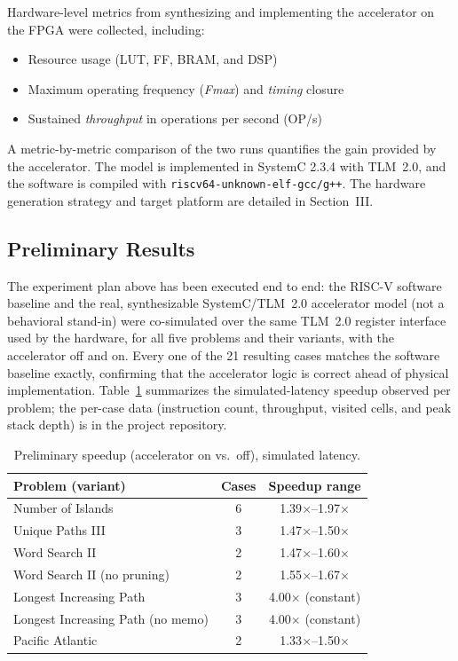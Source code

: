 \documentclass[conference]{IEEEtran}
\begin{document}
Hardware-level metrics from synthesizing and implementing the
accelerator on the FPGA were collected, including:

\begin{itemize}
\item Resource usage (LUT, FF, BRAM, and DSP)
\item Maximum operating frequency (\textit{Fmax}) and \textit{timing} closure
\item Sustained \textit{throughput} in operations per second (OP/s)
\end{itemize}

A metric-by-metric comparison of the two runs quantifies the gain provided by
the accelerator. The model is implemented in SystemC 2.3.4 with TLM~2.0, and the
software is compiled with \texttt{riscv64-unknown-elf-gcc/g++}. The hardware generation strategy and target platform are detailed in
Section~III.

\subsection{Preliminary Results}

The experiment plan above has been executed end to end: the RISC-V software
baseline and the real, synthesizable SystemC/TLM~2.0 accelerator model (not a
behavioral stand-in) were co-simulated over the same TLM~2.0 register
interface used by the hardware, for all five problems and their variants,
with the accelerator off and on. Every one of the 21 resulting cases matches
the software baseline exactly, confirming that the accelerator logic is
correct ahead of physical implementation. Table~\ref{tab:prelim_results}
summarizes the simulated-latency speedup observed per problem; the
per-case data (instruction count, throughput, visited cells, and peak
stack depth) is in the project repository.

\begin{table}[h]
\centering
\caption{Preliminary speedup (accelerator on vs.\ off), simulated latency.}
\label{tab:prelim_results}
\renewcommand{\arraystretch}{1.15}
\begin{tabular}{@{}p{3.55cm}cc@{}}
\toprule
\textbf{Problem (variant)} & \textbf{Cases} & \textbf{Speedup range} \\
\midrule
Number of Islands & 6 & 1.39$\times$--1.97$\times$ \\
Unique Paths III & 3 & 1.47$\times$--1.50$\times$ \\
Word Search II & 2 & 1.47$\times$--1.60$\times$ \\
Word Search II (no pruning) & 2 & 1.55$\times$--1.67$\times$ \\
Longest Increasing Path & 3 & 4.00$\times$ (constant) \\
Longest Increasing Path (no memo) & 3 & 4.00$\times$ (constant) \\
Pacific Atlantic & 2 & 1.33$\times$--1.50$\times$ \\
\bottomrule
\end{tabular}
\end{table}
\end{document}
